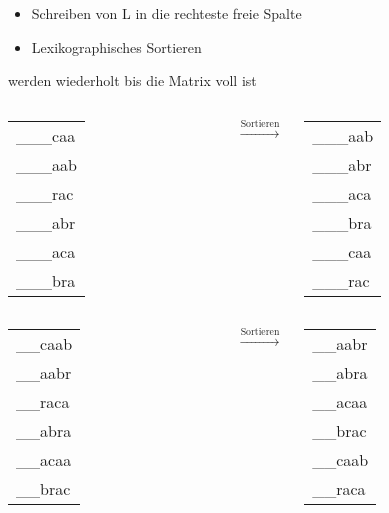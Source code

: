 \documentclass[14pt,xcolor=dvipsnames,pdftex]{beamer}
\begin{document}
\begin{frame}[allowframebreaks]
\begin{itemize}
\begin{itemize}
  \item Schreiben von L in die rechteste freie Spalte
  \item Lexikographisches Sortieren
 \end{itemize}
 werden wiederholt bis die Matrix voll ist
\end{itemize}
\framebreak
\begin{columns}
 \begin{tabular}{T}
    \_\_\_{\color{red}c}aa\\
    \_\_\_{\color{red}a}ab\\
    \_\_\_{\color{red}r}ac\\
    \_\_\_{\color{red}a}br\\
    \_\_\_{\color{red}a}ca\\
    \_\_\_{\color{red}b}ra
  \end{tabular}
 $\xrightarrow{\text{Sortieren}}$
 \begin{tabular}{T}
    \_\_\_aab\\
    \_\_\_abr\\
    \_\_\_aca\\
    \_\_\_bra\\
    \_\_\_caa\\
    \_\_\_rac
  \end{tabular}
\end{columns}
\framebreak
\begin{columns}
 \begin{tabular}{T}
    \_\_{\color{red}c}aab\\
    \_\_{\color{red}a}abr\\
    \_\_{\color{red}r}aca\\
    \_\_{\color{red}a}bra\\
    \_\_{\color{red}a}caa\\
    \_\_{\color{red}b}rac
  \end{tabular}
 $\xrightarrow{\text{Sortieren}}$
 \begin{tabular}{T}
    \_\_aabr\\
    \_\_abra\\
    \_\_acaa\\
    \_\_brac\\
    \_\_caab\\
    \_\_raca
  \end{tabular}
\end{columns}
\framebreak

\end{frame}
\end{document}
